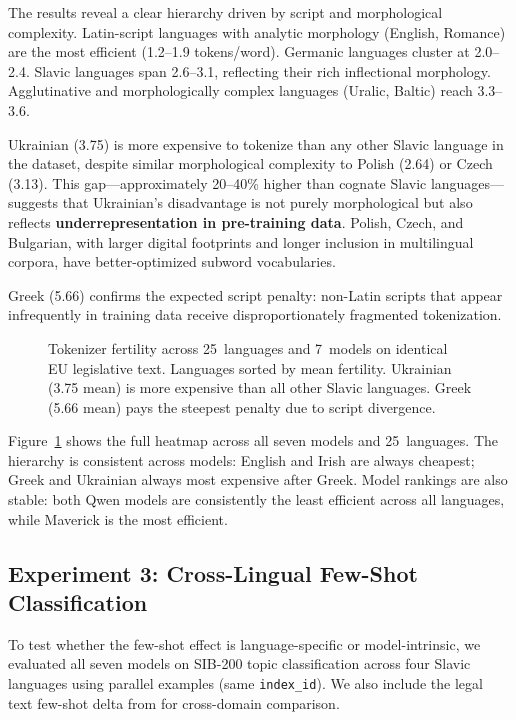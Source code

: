 \documentclass[11pt,a4paper]{article}
\begin{document}
The results reveal a clear hierarchy driven by script and morphological complexity. Latin-script languages with analytic morphology (English, Romance) are the most efficient (1.2--1.9 tokens/word). Germanic languages cluster at 2.0--2.4. Slavic languages span 2.6--3.1, reflecting their rich inflectional morphology. Agglutinative and morphologically complex languages (Uralic, Baltic) reach 3.3--3.6.

Ukrainian (3.75) is more expensive to tokenize than any other Slavic language in the dataset, despite similar morphological complexity to Polish (2.64) or Czech (3.13). This gap---approximately 20--40\% higher than cognate Slavic languages---suggests that Ukrainian's disadvantage is not purely morphological but also reflects \textbf{underrepresentation in pre-training data}. Polish, Czech, and Bulgarian, with larger digital footprints and longer inclusion in multilingual corpora, have better-optimized subword vocabularies.

Greek (5.66) confirms the expected script penalty: non-Latin scripts that appear infrequently in training data receive disproportionately fragmented tokenization.

\begin{figure}[t]
\centering

\caption{Tokenizer fertility across 25~languages and 7~models on identical EU legislative text. Languages sorted by mean fertility. Ukrainian (3.75 mean) is more expensive than all other Slavic languages. Greek (5.66 mean) pays the steepest penalty due to script divergence.}
\label{fig:eu_heatmap}
\end{figure}

Figure~\ref{fig:eu_heatmap} shows the full heatmap across all seven models and 25~languages. The hierarchy is consistent across models: English and Irish are always cheapest; Greek and Ukrainian always most expensive after Greek. Model rankings are also stable: both Qwen models are consistently the least efficient across all languages, while Maverick is the most efficient.

\subsection{Experiment 3: Cross-Lingual Few-Shot Classification}
\label{sec:exp3}

To test whether the few-shot effect is language-specific or model-intrinsic, we evaluated all seven models on SIB-200 topic classification across four Slavic languages using parallel examples (same \texttt{index\_id}). We also include the legal text few-shot delta from \citet{ovcharov2026tokenizer} for cross-domain comparison.
\end{document}

